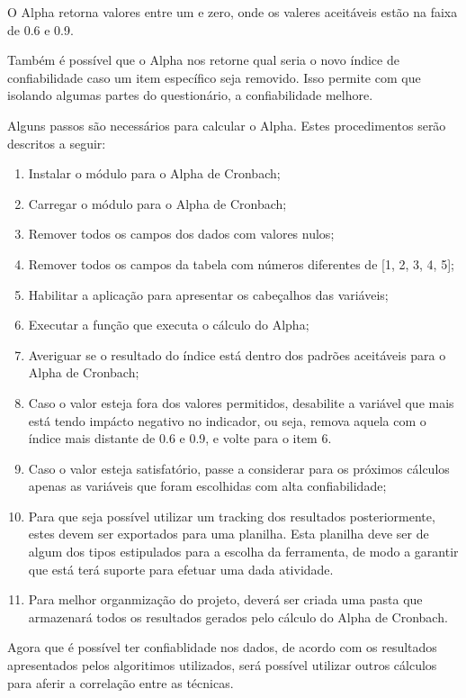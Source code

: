 O Alpha retorna valores entre um e zero, onde os valeres aceitáveis estão na faixa de 0.6 e 0.9.

Também é possível que o Alpha nos retorne qual seria o novo índice de confiabilidade caso um item específico seja removido.
Isso permite com que isolando algumas partes do questionário, a confiabilidade melhore.

Alguns passos são necessários para calcular o Alpha. Estes procedimentos serão descritos a seguir:

\begin{enumerate}
    \item Instalar o módulo para o Alpha de Cronbach;
    \item Carregar o módulo para o Alpha de Cronbach;
    \item Remover todos os campos dos dados com valores nulos;
    \item Remover todos os campos da tabela com números diferentes de [1, 2, 3, 4, 5];
    \item Habilitar a aplicação para apresentar os cabeçalhos das variáveis;
    \item Executar a função que executa o cálculo do Alpha;
    \item Averiguar se o resultado do índice está dentro dos padrões aceitáveis para o Alpha de Cronbach;
    \item Caso o valor esteja fora dos valores permitidos, desabilite a variável que mais está tendo impácto negativo no indicador,
        ou seja, remova aquela com o índice mais distante de 0.6 e 0.9, e volte para o item 6.
    \item Caso o valor esteja satisfatório, passe a considerar para os próximos cálculos apenas as variáveis que foram
        escolhidas com alta confiabilidade;
    \item Para que seja possível utilizar um tracking dos resultados posteriormente, estes devem ser exportados para uma planilha.
        Esta planilha deve ser de algum dos tipos estipulados para a escolha da ferramenta, de modo a garantir que está terá suporte
        para efetuar uma dada atividade.
    \item Para melhor organmização do projeto, deverá ser criada uma pasta que armazenará todos os resultados gerados pelo cálculo do Alpha
        de Cronbach.
\end{enumerate}

Agora que é possível ter confiablidade nos dados, de acordo com os resultados apresentados pelos algoritimos utilizados, será
possível
utilizar outros cálculos para aferir a correlação entre as técnicas.

